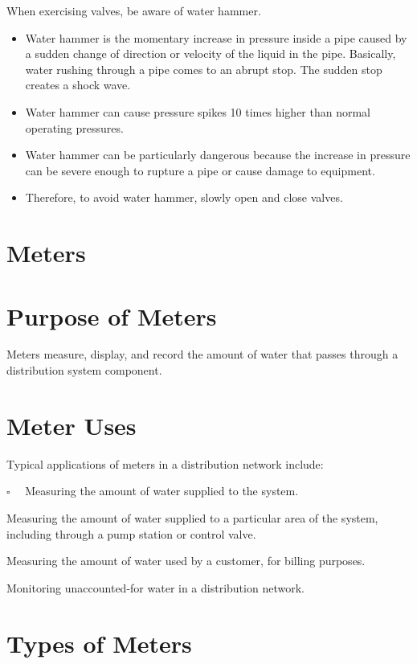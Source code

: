 \documentclass[10pt]{article}
\begin{document}
When exercising valves, be aware of water hammer.

\begin{itemize}
  \item Water hammer is the momentary increase in pressure inside a pipe caused by a sudden change of direction or velocity of the liquid in the pipe. Basically, water rushing through a pipe comes to an abrupt stop. The sudden stop creates a shock wave.

  \item Water hammer can cause pressure spikes 10 times higher than normal operating pressures.

  \item Water hammer can be particularly dangerous because the increase in pressure can be severe enough to rupture a pipe or cause damage to equipment.

  \item Therefore, to avoid water hammer, slowly open and close valves.

\end{itemize}
\section{Meters}
\section{Purpose of Meters}
Meters measure, display, and record the amount of water that passes through a distribution system component.

\section{Meter Uses}
Typical applications of meters in a distribution network include:

$\square \quad$ Measuring the amount of water supplied to the system.

Measuring the amount of water supplied to a particular area of the system, including through a pump station or control valve.

Measuring the amount of water used by a customer, for billing purposes.

Monitoring unaccounted-for water in a distribution network.

\section{Types of Meters}
\end{document}
